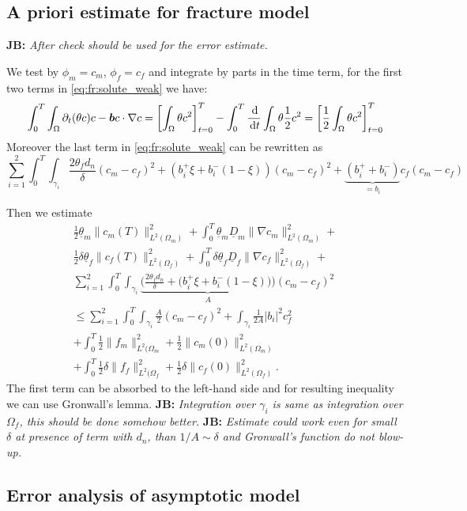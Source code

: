 \documentclass[a4paper]{article}
\def\prtl{\partial}
\def\vc#1{\mathbf{\boldsymbol{#1}}}     %
\def\abs#1{\lvert#1\rvert}
\def\grad{\nabla}
\def\d {\,{\rm d}}
\def\norm#1{\|#1\|}
\newcommand{\note}[2]{{\color{blue} \textbf{ #1:} \textit{#2}}}
\begin{document}
\subsection{A priori estimate for fracture model}
\note{JB}{After check should be used for the error estimate.}

We test by $\phi_m=c_m$, $\phi_f=c_f$ and integrate by parts in the time term, for the first two terms in \eqref{eq:fr:solute_weak} we have:
\[
    \int_0^T \int_{\Omega} \prtl_t(\theta c)c - \vc b c \cdot \grad c = 
    \left[
        \int_{\Omega} \theta c^2
    \right]_{t=0}^{T}
    -\int_0^T \frac{\d}{\d t} \int_{\Omega} \theta \frac12 c^2 =     
    \left[
        \frac12 \int_{\Omega} \theta c^2
    \right]_{t=0}^{T}
\]
Moreover the last term in \eqref{eq:fr:solute_weak} can be rewritten as
\[
   \sum_{i=1}^{2} \int_0^T \int_{\gamma_i} 
   \frac{2\theta_f d_n}{\delta} (c_m - c_f)^2
   + (b_i^+ \xi + b_i^-(1-\xi))(c_m-c_f)^2
   + \underbrace{(b_i^+ + b_i^-)}_{=b_i}c_f(c_m-c_f)
\]

Then we estimate
\def\ul{\underline}
\begin{align*}
  \frac12 \ul{\theta}_m\norm{c_m(T)}_{L^2(\Omega_m)}^2 + \int_0^T \ul{\theta}_m \ul{D}_m \norm{\grad c_m}_{L^2(\Omega_m)}^2 + \\
  \frac12 \delta\ul{\theta}_f\norm{c_f(T)}_{L^2(\Omega_f)}^2 + \int_0^T \delta \ul{\theta}_f \ul{D}_f \norm{\grad c_f}_{L^2(\Omega_f)}^2+\\
   \sum_{i=1}^{2} \int_0^T \int_{\gamma_i} \underbrace{\Big(\frac{2\theta_f d_n}{\delta} + \big(b_i^+ \xi + b_i^-(1-\xi)\big)\Big)}_{A} (c_m-c_f)^2\\
   \le \sum_{i=1}^2 \int_0^T \int_{\gamma_i} \frac{A}{2} (c_m-c_f)^2 + \int_{\gamma_i} \frac{1}{2A}\abs{b_i}^2 c_f^2 \\
   + \int_0^T \frac12\norm{f_m}^2_{L^2(\Omega_m} + \frac12\norm{c_m(0)}^2_{L^2(\Omega_m)}\\
   + \int_0^T \frac12\delta\norm{f_f}^2_{L^2(\Omega_f} + \frac12\delta\norm{c_f(0)}^2_{L^2(\Omega_f)}.
\end{align*}
The first term can be absorbed to the left-hand side and for resulting inequality we can use Gronwall's lemma. 
\note{JB}{Integration over $\gamma_i$ is same as integration over $\Omega_f$, this should be done somehow better.}
\note{JB}{
Estimate could work even for small $\delta$ at presence of term with $d_n$, than $1/A \sim \delta$ and Gronwall's function do not blow-up.}



\subsection{Error analysis of asymptotic model}
\end{document}
